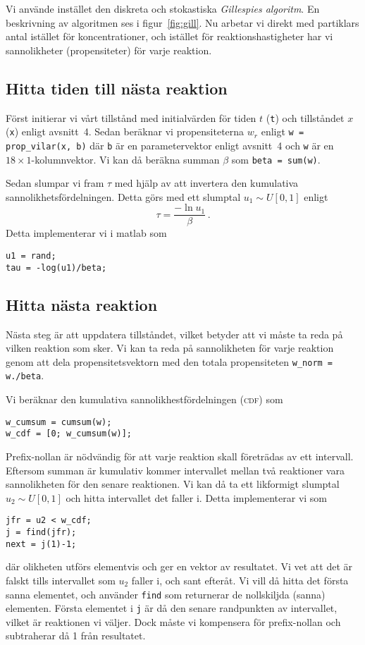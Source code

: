 Vi använde instället den diskreta och stokastiska \emph{Gillespies algoritm}. En beskrivning av algoritmen ses i figur~\ref{fig:gill}. Nu arbetar vi
direkt med partiklars antal istället för koncentrationer, och istället för
reaktionshastigheter har vi sannolikheter (propensiteter) för varje reaktion.

\subsection{Hitta tiden till nästa reaktion}

Först initierar vi vårt tillstånd med initialvärden för tiden $t$ (\lstinline|t|) och tillståndet $x$ (\lstinline|x|) enligt avsnitt~4. Sedan beräknar vi propensiteterna $w_r$ enligt \lstinline|w = prop_vilar(x, b)| där \lstinline|b| är en parametervektor enligt avsnitt~4 och \lstinline|w| är en $18 \times 1$-kolumnvektor. Vi kan då beräkna summan $\beta$ som \lstinline|beta = sum(w)|.

Sedan slumpar vi fram $\tau$ med hjälp av att invertera den kumulativa sannolikhetsfördelningen. Detta görs med ett slumptal $u_1 \sim U[0,1]$ enligt
\begin{equation}
\tau = \frac{-\ln u_1}{\beta} \, .
\end{equation}
Detta implementerar vi i matlab som
\begin{lstlisting}
u1 = rand;
tau = -log(u1)/beta;
\end{lstlisting}

\subsection{Hitta nästa reaktion}

Nästa steg är att uppdatera tillståndet, vilket betyder att vi måste ta reda på vilken reaktion som sker. Vi kan ta reda på sannolikheten för varje reaktion genom att dela propensitetsvektorn med den totala propensiteten \lstinline|w_norm = w./beta|. 

Vi beräknar den kumulativa sannolikhestfördelningen (\textsc{cdf}) som\begin{lstlisting}
w_cumsum = cumsum(w);
w_cdf = [0; w_cumsum(w)];
\end{lstlisting}
Prefix-nollan är nödvändig för att varje reaktion skall företrädas av ett intervall. Eftersom summan är kumulativ kommer intervallet mellan två reaktioner vara sannolikheten för den senare reaktionen. Vi kan då ta ett likformigt slumptal $u_2 \sim U[0,1]$ och hitta intervallet det faller i. Detta implementerar vi som
\begin{lstlisting}
jfr = u2 < w_cdf;
j = find(jfr);
next = j(1)-1;
\end{lstlisting}
där olikheten utförs elementvis och ger en vektor av resultatet. Vi vet att det är falskt tills intervallet som $u_2$ faller i, och sant efteråt. Vi vill då hitta det första sanna elementet, och använder \lstinline|find| som returnerar de nollskiljda (sanna) elementen. Första elementet i \lstinline|j| är då den senare randpunkten av intervallet, vilket är reaktionen vi väljer. Dock måste vi kompensera för prefix-nollan och subtraherar då 1 från resultatet.

